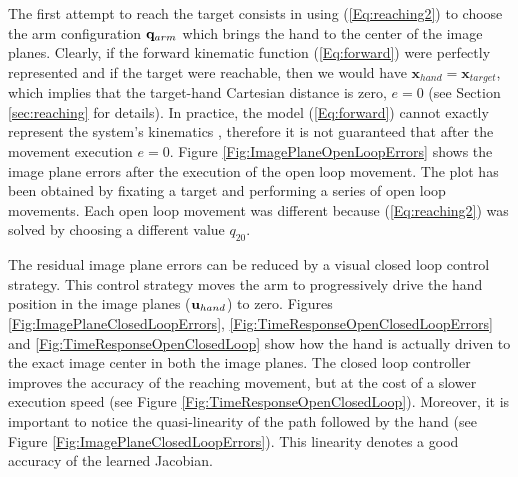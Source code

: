 The first attempt to reach the target consists in using (\ref{Eq:reaching2})
to choose the arm configuration $\mathbf q_{arm}$ which brings the hand to the center 
of the image planes. Clearly, if the forward 
kinematic function (\ref{Eq:forward}) were perfectly represented and if the 
target were reachable, then we would have 
$\mathbf x_{hand} =  \mathbf x_{target}$, which implies that the target-hand 
Cartesian distance is zero, $e=0$ (see Section \ref{sec:reaching} 
for details). In practice, the model (\ref{Eq:forward}) cannot exactly 
represent the system's kinematics
, therefore it is 
not guaranteed that after the movement 
execution $e=0$. Figure \ref{Fig:ImagePlaneOpenLoopErrors}
shows the image plane errors after the execution of the open loop movement. 
The plot has been obtained by fixating a target and performing a series of 
open loop movements. Each open loop 
movement was different because (\ref{Eq:reaching2}) was solved 
by choosing a different value $q_{20}$.

%
The residual image plane errors can be reduced 
by a visual closed loop control strategy. This control strategy moves the 
arm to progressively 
drive the hand position in the image planes ($\mathbf{u}_{hand}$) to zero. Figures
\ref{Fig:ImagePlaneClosedLoopErrors}, %
\ref{Fig:TimeResponseOpenClosedLoopErrors} and \ref{Fig:TimeResponseOpenClosedLoop}  
show how the hand is actually driven to the 
exact image center in both the image planes. The closed loop controller 
improves the accuracy of the reaching movement, but at the cost of a slower 
execution speed (see Figure \ref{Fig:TimeResponseOpenClosedLoop}). 
Moreover, it is important to notice 
the quasi-linearity of the path followed by the hand 
(see Figure \ref{Fig:ImagePlaneClosedLoopErrors}). This linearity denotes 
a good accuracy of the learned Jacobian.

